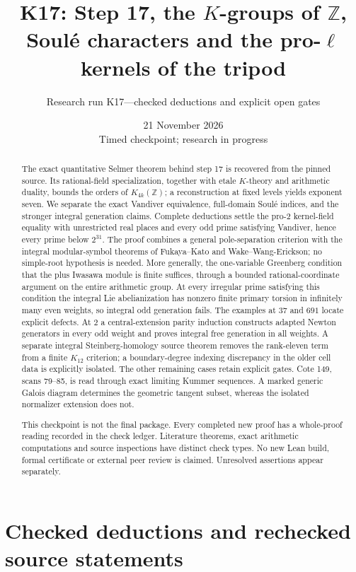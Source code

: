 \documentclass[11pt,a4paper]{article}
\title{K17: Step 17, the $K$-groups of $\mathbb Z$,\\
Soul\'e characters and the pro-$\ell$ kernels of the tripod}
\author{Research run K17---checked deductions and explicit open gates}
\date{21 November 2026\\Timed checkpoint; research in progress}
\theoremstyle{definition}
\begin{document}
\maketitle
\begin{abstract}
The exact quantitative Selmer theorem behind step 17 is recovered from
the pinned source. Its rational-field specialization, together with
etale $K$-theory and arithmetic duality, bounds the orders of
$K_{4k}(\mathbb Z)$; a reconstruction at fixed levels yields exponent
seven. We separate the exact Vandiver equivalence, full-domain Soul\'e
indices, and the stronger integral generation claims. Complete
deductions settle the pro-$2$ kernel-field equality with unrestricted
real places and every odd prime satisfying Vandiver, hence every
prime below $2^{31}$. The proof combines a general pole-separation
criterion with the integral modular-symbol theorems of Fukaya--Kato
and Wake--Wang-Erickson; no simple-root hypothesis is needed. More generally, the one-variable Greenberg
condition that the plus Iwasawa module is finite suffices, through a
bounded rational-coordinate argument on the entire arithmetic group. At every
irregular prime satisfying this condition the integral Lie abelianization has nonzero
finite primary torsion in infinitely many even weights, so integral odd
generation fails. The examples at $37$ and $691$ locate explicit defects.
At $2$ a central-extension
parity induction constructs adapted Newton generators in every odd
weight and proves integral free generation in all weights. A separate
integral Steinberg-homology source theorem removes the rank-eleven term
from a finite $K_{12}$ criterion; a boundary-degree indexing discrepancy
in the older cell data is explicitly isolated. The other remaining
cases retain explicit gates. Cote 149, scans 79--85, is read through
exact limiting Kummer sequences. A marked generic Galois diagram
determines the geometric tangent subset, whereas the isolated normalizer
extension does not.

This checkpoint is not the final package. Every completed new proof
has a whole-proof reading recorded in the check ledger. Literature
theorems, exact arithmetic computations and source inspections have
distinct check types. No new Lean build, formal certificate or external
peer review is claimed. Unresolved assertions appear separately.
\end{abstract}
\tableofcontents
\clearpage
\part{Checked deductions and rechecked source statements}
\end{document}
